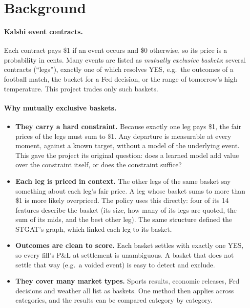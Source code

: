 \documentclass[11pt,a4paper]{article}
\begin{document}
\section{Background}

\paragraph{Kalshi event contracts.} Each contract pays \$1 if an event occurs and \$0 otherwise, so its price is
a probability in cents. Many events are listed as \emph{mutually exclusive baskets}: several contracts (``legs''),
exactly one of which resolves YES, e.g.\ the outcomes of a football match, the bucket for a Fed decision, or the
range of tomorrow's high temperature. This project trades only such baskets.

\paragraph{Why mutually exclusive baskets.}
\begin{itemize}
  \item \textbf{They carry a hard constraint.} Because exactly one leg pays \$1, the fair prices of the legs must
        sum to \$1. Any departure is measurable at every moment, against a known target, without a model of the
        underlying event. This gave the project its original question: does a learned model add value over the
        constraint itself, or does the constraint suffice?
  \item \textbf{Each leg is priced in context.} The other legs of the same basket say something about each leg's
        fair price. A leg whose basket sums to more than \$1 is more likely overpriced. The policy uses this
        directly: four of its 14 features describe the basket (its size, how many of its legs are quoted, the sum
        of its mids, and the best other leg). The same structure defined the STGAT's graph, which linked each leg to its basket.
  \item \textbf{Outcomes are clean to score.} Each basket settles with exactly one YES, so every fill's P\&L at
        settlement is unambiguous. A basket that does not settle that way (e.g.\ a voided event) is easy to detect
        and exclude.
  \item \textbf{They cover many market types.} Sports results, economic releases, Fed decisions and weather all
        list as baskets. One method then applies across categories, and the results can be compared category by
        category.
\end{itemize}
\end{document}
